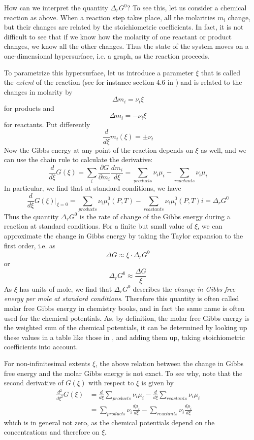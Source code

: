 \documentclass[a4paper, draft]{article}
\theoremstyle{own}
\theoremstyle{remark}
\begin{document}
How can we interpret the quantity $\Delta_r G^0$? To see this, let us consider a chemical reaction as above. When a reaction step takes place, all the molarities $m_i$ change, but their changes are related by the stoichiometric coefficients. In fact, it is not difficult to see that if we know how the molarity of one reactant or product changes, we know all the other changes. Thus the state of the system moves on a one-dimensional hypersurface, i.e. a graph, as the reaction proceeds.

To parametrize this hypersurface, let us introduce a parameter $\xi$ that is called the {\em extent} of the reaction (see for instance section 4.6 in \cite{Petrucci}) and is related to the changes in molarity by
$$
\Delta m_i = \nu_i \xi
$$
for products and
$$
\Delta m_i = - \nu_i \xi
$$
for reactants. Put differently
$$
\frac{d}{d \xi} m_i(\xi) = \pm \nu_i
$$
Now the Gibbs energy at any point of the reaction depends on $\xi$ as well, and we can use the chain rule to calculate the derivative:
$$
\frac{d}{d\xi} G(\xi) = \sum_i \frac{\partial G}{\partial m_i} \frac{d m_i}{d \xi} = \sum_{products} \nu_i \mu_i  - \sum_{reactants}  \nu_i \mu_i
$$
In particular, we find that at standard conditions, we have
$$
\frac{d}{d\xi} G(\xi) | _{\xi = 0} = \sum_{products} \nu_i \mu_i^0(P, T)  - \sum_{reactants} \nu_i \mu_i^0(P, T) i = \Delta_r G^0
$$
Thus the quantity $\Delta_r G^0$ is the rate of change of the Gibbs energy during a reaction at standard conditions. For a finite but small value of $\xi$, we can approximate the change in Gibbs energy by taking the Taylor expansion to the first order, i.e. as
$$
\Delta G \approx \xi \cdot \Delta_r G^0 
$$
or
$$
\Delta_r G^0  \approx \frac{\Delta G}{\xi}
$$
As $\xi$ has units of mole, we find that $\Delta_r G^0$ describes the {\em change in Gibbs free energy per mole at standard conditions}. Therefore this quantity is often called molar free Gibbs energy in chemistry books, and in fact the same name is often used for the chemical potentials. As, by definition, the molar free Gibbs energy is the weighted sum of the chemical potentials, it can be determined by looking up these values in a table like those in \cite{Tables}, and adding them up, taking stoichiometric coefficients into account.

For non-infinitesimal extents $\xi$, the above relation between the change in Gibbs free energy and the molar Gibbs energy is not exact. To see why, note that the second derivative of $G(\xi)$ with respect to $\xi$ is given by
\begin{align*}
\frac{d^2}{d \xi^2} G(\xi) &= \frac{d}{d \xi} \sum_{products} \nu_i \mu_i - \frac{d}{d \xi} \sum_{reactants} \nu_i \mu_i \\
&= \sum_{products} \nu_i \frac{d \mu_i}{d \xi} - \sum_{reactants} \nu_i \frac{d \mu_i}{d \xi}
\end{align*}
which is in general not zero, as the chemical potentials depend on the concentrations and therefore on $\xi$. 
\end{document}
